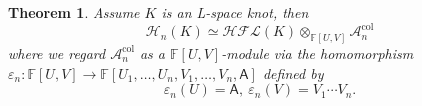 \documentclass{amsart}
\newtheorem{theorem}{Theorem}[section]
\newtheorem{remark}[theorem]{Remark}
\newtheorem{definition}[theorem]{Definition}
\newcommand{\CA}{\mathcal{A}}
\newcommand{\CH}{\mathcal{H}}
\newcommand{\col}{\mathrm{col}}
\newcommand{\F}{\mathbb{F}}
\newcommand{\cHFL}{\mathcal{H\!F\! L}}
\def\gr{\textup{gr}}
\newcommand{\EG}[1]{{\color{red}#1}}
\newcommand{\AAA}{\mathsf{A}}
\begin{document}
 




\begin{theorem}
\label{thm: colored tensor product}
Assume $K$ is an L-space knot, then
$$
\CH_{n}(K)\simeq \cHFL(K)\otimes_{\F[U,V]}\CA_n^{\col}
$$
where we regard $\CA_n^{\col}$ as a $\F[U,V]$-module via the homomorphism $\varepsilon_n:\F[U,V]\to \F[U_1,\ldots,U_n,V_1,\ldots,V_n,\AAA]$
defined by
$$
\varepsilon_n(U)=\AAA,\ \varepsilon_n(V)=V_1\cdots V_n.
$$

\end{theorem}
 
\end{document}
